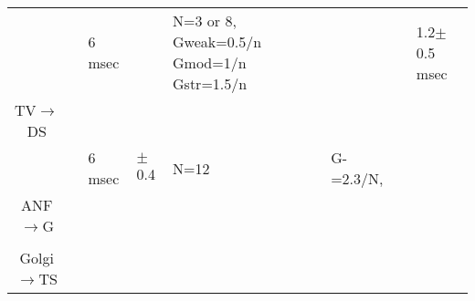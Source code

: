 \begin{longtable}{cXXXXXXX}
                                 &           \citep{ErikssonRobert:1999}            &                                                       6 msec                                                       &                                                           & N=3 or 8, Gweak=0.5/n Gmod=1/n Gstr=1.5/n &                                                                                             &                                           & 1.2$\pm$0.5 msec \\ 
  TV\ensuremath{\rightarrow}DS   &                                                  &                                                                                                                    &                                                           &                                           &                                                                                             &                                           & \\\midrule
                                 &           \citep{ErikssonRobert:1999}            &                                                       6 msec                                                       &                         $\pm$0.4                          &                   N=12                    &                                          G-=2.3/N,                                          &                                           & \\ 
  ANF\ensuremath{\rightarrow}G   &                                                  &                                                                                                                    &                                                           &                                           &                                                                                             &                                           & \\\midrule
                                 &                                                  &                                                                                                                    &                                                           &                                           &                                                                                             &                                           & \\ 
Golgi\ensuremath{\rightarrow}TS  &                                                  &                                                                                                                    &                                                           &                                           &                                                                                             &                                           & \\\midrule

\end{longtable}
